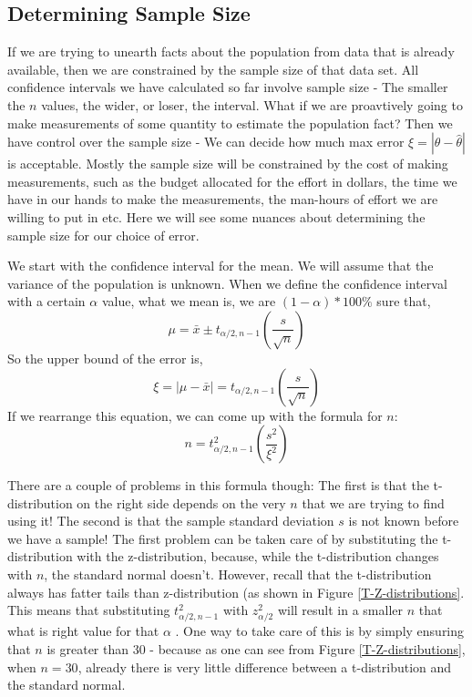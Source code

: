 \subsection{Determining Sample Size}
If we are trying to unearth facts about the population from data that is already available, then we are constrained by the sample size of that data set. All confidence intervals we have calculated so far involve sample size - The smaller the $n$ values, the wider, or loser, the interval. What if we are proavtively going to make measurements of some quantity to estimate the population fact? Then we have control over the sample size - We can decide how much max error \( \xi = |\theta - \hat{\theta}| \) is acceptable. Mostly the sample size will be constrained by the cost of making measurements, such as the budget allocated for the effort in dollars, the time we have in our hands to make the measurements, the man-hours of effort we are willing to put in etc. Here we will see some nuances about determining the sample size for our choice of error. 

We start with the confidence interval for the mean. We will assume that the variance of the population is unknown. When we define the confidence interval with a certain $\alpha$ value, what we mean is, we are \( (1-\alpha)*100\% \) sure that,
	\[ \mu = \bar{x} \pm t_{\alpha/2,n-1}\left(\dfrac{s}{\sqrt{n}}\right) \]
So the upper bound of the error is,
	\[ \xi = |\mu - \bar{x}| = t_{\alpha/2,n-1} \left(\dfrac{s}{\sqrt{n}}\right) \]
If we rearrange this equation, we can come up with the formula for $n$:	
	\[ n = t_{\alpha/2,n-1}^2 \left(\dfrac{s^2}{\xi^2}\right) \]

There are a couple of problems in this formula though: The first is that the t-distribution on the right side depends on the very $n$ that we are trying to find using it! The second is that the sample standard deviation $s$ is not known before we have a sample! The first problem can be taken care of by substituting the t-distribution with the z-distribution, because, while the t-distribution changes with $n$, the standard normal doesn't. However, recall that the t-distribution always has fatter tails than z-distribution (as shown in Figure \ref{T-Z-distributions}. This means that substituting \( t_{\alpha/2,n-1}^2 \) with \( z_{\alpha/2}^2 \) will result in a smaller $n$ that what is right value for that $\alpha$ . One way to take care of this is by simply ensuring that $n$ is greater than 30 - because as one can see from Figure \ref{T-Z-distributions}, when $n=30$, already there is very little difference between a t-distribution and the standard normal. 

